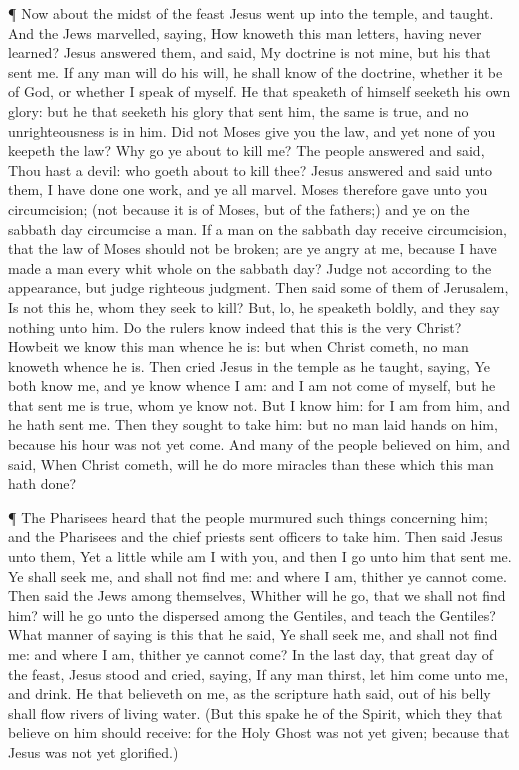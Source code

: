  ¶ Now about the midst of the feast Jesus went up into the
temple, and taught.  And the Jews marvelled, saying, How
knoweth this man letters, having never learned?  Jesus
answered them, and said, My doctrine is not mine, but his that sent me.
 If any man will do his will, he shall know of the
doctrine, whether it be of God, or whether I speak of myself.
 He that speaketh of himself seeketh his own glory: but he
that seeketh his glory that sent him, the same is true, and no
unrighteousness is in him.  Did not Moses give you the law,
and yet none of you keepeth the law? Why go ye about to kill me?
 The people answered and said, Thou hast a devil: who goeth
about to kill thee?  Jesus answered and said unto them, I
have done one work, and ye all marvel.  Moses therefore
gave unto you circumcision; (not because it is of Moses, but of the
fathers;) and ye on the sabbath day circumcise a man.  If a
man on the sabbath day receive circumcision, that the law of Moses
should not be broken; are ye angry at me, because I have made a man
every whit whole on the sabbath day?  Judge not according
to the appearance, but judge righteous judgment.  Then said
some of them of Jerusalem, Is not this he, whom they seek to kill?
 But, lo, he speaketh boldly, and they say nothing unto
him. Do the rulers know indeed that this is the very Christ?
 Howbeit we know this man whence he is: but when Christ
cometh, no man knoweth whence he is.  Then cried Jesus in
the temple as he taught, saying, Ye both know me, and ye know whence I
am: and I am not come of myself, but he that sent me is true, whom ye
know not.  But I know him: for I am from him, and he hath
sent me.  Then they sought to take him: but no man laid
hands on him, because his hour was not yet come.  And many
of the people believed on him, and said, When Christ cometh, will he do
more miracles than these which this man hath done?

 ¶ The Pharisees heard that the people murmured such things
concerning him; and the Pharisees and the chief priests sent officers to
take him.  Then said Jesus unto them, Yet a little while am
I with you, and then I go unto him that sent me.  Ye shall
seek me, and shall not find me: and where I am, thither ye cannot come.
 Then said the Jews among themselves, Whither will he go,
that we shall not find him? will he go unto the dispersed among the
Gentiles, and teach the Gentiles?  What manner of saying is
this that he said, Ye shall seek me, and shall not find me: and where I
am, thither ye cannot come?  In the last day, that great
day of the feast, Jesus stood and cried, saying, If any man thirst, let
him come unto me, and drink.  He that believeth on me, as
the scripture hath said, out of his belly shall flow rivers of living
water.  (But this spake he of the Spirit, which they that
believe on him should receive: for the Holy Ghost was not yet given;
because that Jesus was not yet glorified.)

